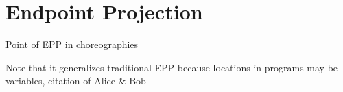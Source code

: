 \section{Endpoint Projection}
\label{sec:endpoint-projection}

\todo Point of EPP in choreographies

\todo Note that it generalizes traditional EPP because locations in programs may be variables, citation of Alice \& Bob 





